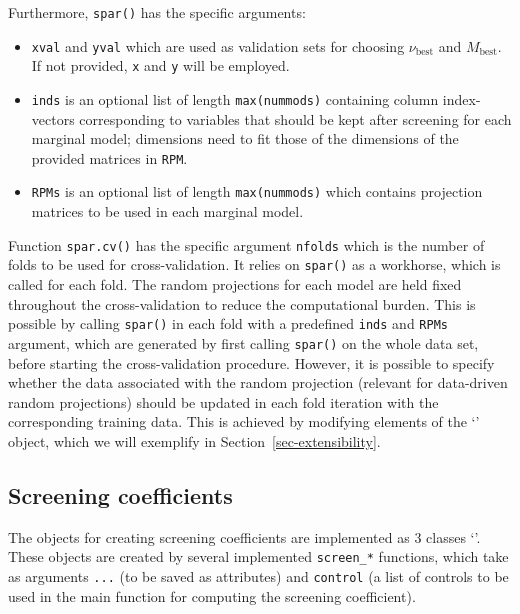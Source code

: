 \documentclass[
  article,
  nojss]{jss}
\newcommand{\class}[1]{`\code{#1}'}
\begin{document}
Furthermore, \texttt{spar()} has the specific arguments:

\begin{itemize}
\item
  \texttt{xval} and \texttt{yval} which are used as validation sets for
  choosing \(\nu_\text{best}\) and \(M_\text{best}\). If not provided,
  \texttt{x} and \texttt{y} will be employed.
\item
  \texttt{inds} is an optional list of length \texttt{max(nummods)}
  containing column index-vectors corresponding to variables that should
  be kept after screening for each marginal model; dimensions need to
  fit those of the dimensions of the provided matrices in \texttt{RPM}.
\item
  \texttt{RPMs} is an optional list of length \texttt{max(nummods)}
  which contains projection matrices to be used in each marginal model.
\end{itemize}

Function \texttt{spar.cv()} has the specific argument \texttt{nfolds}
which is the number of folds to be used for cross-validation. It relies
on \texttt{spar()} as a workhorse, which is called for each fold. The
random projections for each model are held fixed throughout the
cross-validation to reduce the computational burden. This is possible by
calling \texttt{spar()} in each fold with a predefined \texttt{inds} and
\texttt{RPMs} argument, which are generated by first calling
\texttt{spar()} on the whole data set, before starting the
cross-validation procedure. However, it is possible to specify whether
the data associated with the random projection (relevant for data-driven
random projections) should be updated in each fold iteration with the
corresponding training data. This is achieved by modifying elements of
the \class{randomprojection} object, which we will exemplify in
Section~\ref{sec-extensibility}.

\subsection{Screening coefficients}\label{screening-coefficients}

The objects for creating screening coefficients are implemented as
3 classes \class{screencoef}. These objects are created by
several implemented \texttt{screen\_*} functions, which take as
arguments \texttt{...} (to be saved as attributes) and \texttt{control}
(a list of controls to be used in the main function for computing the
screening coefficient).
\end{document}
